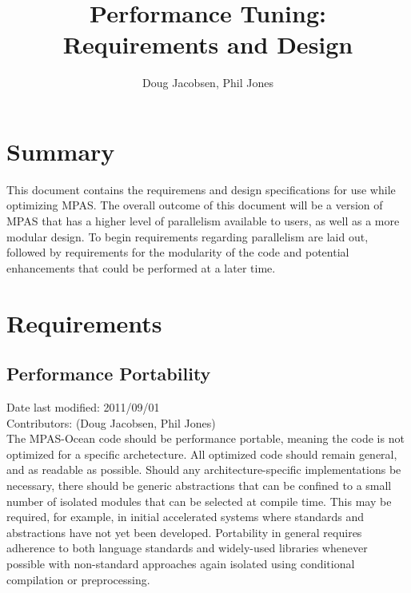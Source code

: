 \documentclass[11pt]{report}
\begin{document}
\title{Performance Tuning: \\
Requirements and Design}
\author{Doug Jacobsen, Phil Jones}

\maketitle
\tableofcontents


\chapter{Summary}

This document contains the requiremens and design specifications for use while
optimizing MPAS. The overall outcome of this document will be a version of MPAS
that has a higher level of parallelism available to users, as well as a more
modular design. To begin requirements regarding parallelism are laid out,
followed by requirements for the modularity of the code and potential
enhancements that could be performed at a later time.


\chapter{Requirements}

\section{Performance Portability}
Date last modified: 2011/09/01 \\
Contributors: (Doug Jacobsen, Phil Jones) \\

The MPAS-Ocean code should be performance portable, meaning the code is not optimized for a specific archetecture. All optimized code should remain general, and as readable as possible.  Should any architecture-specific implementations be necessary, there should be generic abstractions that can be confined to a small number of isolated modules that can be selected at compile time.  This may be required, for example, in initial accelerated systems where standards and abstractions have not yet been developed.  Portability in general requires adherence to both language standards and widely-used libraries whenever possible with non-standard approaches again isolated using conditional compilation or preprocessing.
\end{document}

